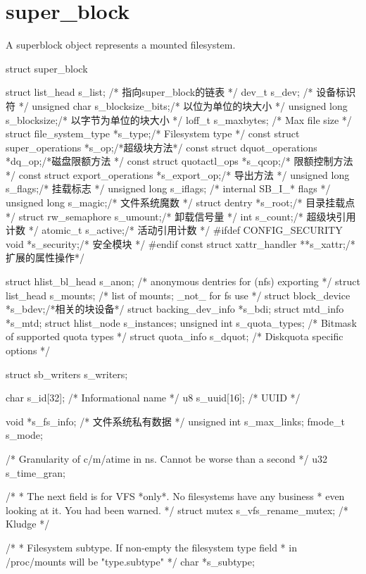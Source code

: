 \section{super\_block}

A superblock object represents a mounted filesystem.

\begin{code}
        
struct super_block {
	struct list_head	s_list;		/* 指向super_block的链表 */
	dev_t			s_dev;		/* 设备标识符 */
	unsigned char		s_blocksize_bits;/* 以位为单位的块大小 */
	unsigned long		s_blocksize;/* 以字节为单位的块大小 */
	loff_t			s_maxbytes;	/* Max file size */
	struct file_system_type	*s_type;/* Filesystem type */
	const struct super_operations	*s_op;/*超级块方法*/
	const struct dquot_operations	*dq_op;/*磁盘限额方法 */
	const struct quotactl_ops	*s_qcop;/* 限额控制方法 */
	const struct export_operations *s_export_op;/* 导出方法 */
	unsigned long		s_flags;/* 挂载标志 */
	unsigned long		s_iflags;	/* internal SB_I_* flags */
	unsigned long		s_magic;/* 文件系统魔数 */
	struct dentry		*s_root;/* 目录挂载点 */
	struct rw_semaphore	s_umount;/* 卸载信号量 */
	int			s_count;/* 超级块引用计数 */
	atomic_t		s_active;/* 活动引用计数 */
#ifdef CONFIG_SECURITY
	void                    *s_security;/* 安全模块 */
#endif
	const struct xattr_handler **s_xattr;/*扩展的属性操作*/

	struct hlist_bl_head	s_anon;		/* anonymous dentries for (nfs) exporting */
	struct list_head	s_mounts;	/* list of mounts; _not_ for fs use */
	struct block_device	*s_bdev;/*相关的块设备*/
	struct backing_dev_info *s_bdi;
	struct mtd_info		*s_mtd;
	struct hlist_node	s_instances;
	unsigned int		s_quota_types;	/* Bitmask of supported quota types */
	struct quota_info	s_dquot;	/* Diskquota specific options */

	struct sb_writers	s_writers;

	char s_id[32];				/* Informational name */
	u8 s_uuid[16];				/* UUID */

	void 			*s_fs_info;	/* 文件系统私有数据 */
	unsigned int		s_max_links;
	fmode_t			s_mode;

	/* Granularity of c/m/atime in ns.
	   Cannot be worse than a second */
	u32		   s_time_gran;

	/*
	 * The next field is for VFS *only*. No filesystems have any business
	 * even looking at it. You had been warned.
	 */
	struct mutex s_vfs_rename_mutex;	/* Kludge */

	/*
	 * Filesystem subtype.  If non-empty the filesystem type field
	 * in /proc/mounts will be "type.subtype"
	 */
	char *s_subtype;

}
\end{code}
